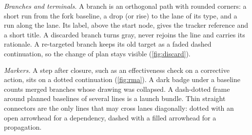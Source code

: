 \emph{Branches and terminals.} A branch is an orthogonal path with rounded
corners: a short run from the fork baseline, a drop (or rise) to the lane
of its type, and a run along the lane. Its label, above the start node,
gives the tracker reference and a short title. A discarded branch turns
gray, never rejoins the line and carries its rationale. A re-targeted
branch keeps its old target as a faded dashed continuation, so the change
of plan stays visible (\cref{fig:discard}).

\emph{Markers.} A step after closure, such as an effectiveness check on a
corrective action, sits on a dotted continuation (\cref{fig:rma}). A dark
badge under a baseline counts merged branches whose drawing was collapsed.
A dash-dotted frame around planned baselines of several lines is a launch
bundle. Thin straight connectors are the only lines that may cross lanes
diagonally: dotted with an open arrowhead for a dependency, dashed with a
filled arrowhead for a propagation.

\providecommand{\HPBglyph}[2][]{%
  \begin{hpbgraph}[col=0.55cm,lane=0.9cm,legend=1.3cm,#1]#2%
    \path ([yshift=3pt]current bounding box.north)
          ([yshift=-3pt]current bounding box.south);%
  \end{hpbgraph}}

